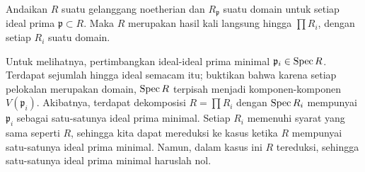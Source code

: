 \begin{exercise} 
Andaikan $R$ suatu gelanggang noetherian dan $R_{\mathfrak{p}}$ suatu domain untuk setiap ideal prima
$\mathfrak{p} \subset R$. Maka $R$ merupakan hasil kali langsung hingga $\prod R_i$, dengan
setiap $R_i$ suatu domain.

Untuk melihatnya, pertimbangkan ideal-ideal prima minimal $\mathfrak{p}_i \in \operatorname{Spec} R$. Terdapat
sejumlah hingga ideal semacam itu; buktikan bahwa karena setiap pelokalan merupakan domain,
$\operatorname{Spec} R$ terpisah menjadi komponen-komponen $V(\mathfrak{p}_i)$.
Akibatnya, terdapat dekomposisi $R = \prod R_{i}$ dengan $\operatorname{Spec} R_i$
mempunyai $\mathfrak{p}_i$ sebagai satu-satunya ideal prima minimal. 
Setiap $R_i$ memenuhi syarat yang sama seperti $R$, sehingga kita dapat mereduksi ke kasus
ketika $R$ mempunyai satu-satunya ideal prima minimal. Namun, dalam kasus ini $R$
tereduksi, sehingga satu-satunya ideal prima minimal haruslah nol.
\end{exercise} 



